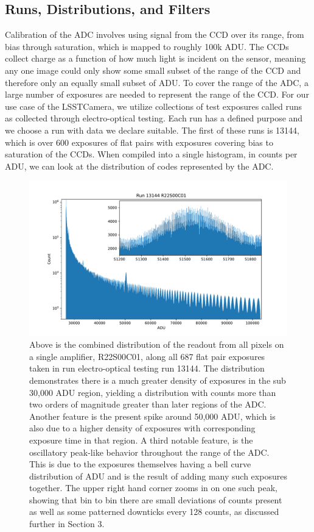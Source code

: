 \documentclass[11pt, letterpaper]{article}
\begin{document}
\subsection{Runs, Distributions, and Filters}
\indent

Calibration of the ADC involves using signal from the CCD over its range, from bias through saturation, which is mapped to roughly 100k ADU. 
The CCDs collect charge as a function of how much light is incident on the sensor, meaning any one image could only show some small subset of the range of the CCD and therefore only an equally small subset of ADU.
To cover the range of the ADC, a large number of exposures are needed to represent the range of the CCD. 
For our use case of the LSSTCamera, we utilize collections of test exposures called runs as collected through electro-optical testing. 
Each run has a defined purpose and we choose a run with data we declare suitable. 
The first of these runs is 13144, which is over 600 exposures of flat pairs with exposures covering bias to saturation of the CCDs. 
When compiled into a single histogram, in counts per ADU, we can look at the distribution of codes represented by the ADC.  

\begin{figure}
    \centering
    \includegraphics[width=0.5\linewidth]{bar1.pdf}
    \caption{Above is the combined distribution of the readout from all pixels on a single amplifier, R22S00C01, along all 687 flat pair exposures taken in run electro-optical testing run 13144. The distribution demonstrates there is a much greater density of exposures in the sub 30,000 ADU region, yielding a distribution with counts more than two orders of magnitude greater than later regions of the ADC. Another feature is the present spike around 50,000 ADU, which is also due to a higher density of exposures with corresponding exposure time in that region. A third notable feature, is the oscillatory peak-like behavior throughout the range of the ADC. This is due to the exposures themselves having a bell curve distribution of ADU and is the result of adding many such exposures together. The upper right hand corner zooms in on one such peak, showing that bin to bin there are small deviations of counts present as well as some patterned downticks every 128 counts, as discussed further in Section 3.}
\end{figure}
\end{document}

